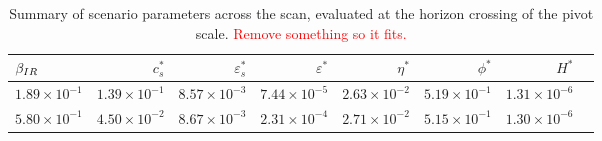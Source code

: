 
\begin{table}[h!]
  \begin{center}
    \begin{tabular}{lrrrrrrr}
        \toprule
        $\beta_{IR}$ &    $c_s^{*}$ &  $\varepsilon_s^{*}$ &   $\varepsilon^{*}$ &   $\eta^{*}$ &  $\phi^{*}$ &     $H^{*}$ \\
        \midrule
        $1.89\times 10^{-1}$  &  $1.39\times 10^{-1}$  &  $  8.57\times 10^{-3}$  &  $7.44\times 10^{-5}$  &  $2.63\times 10^{-2}$ &  $5.19\times 10^{-1}$  &  $1.31\times 10^{-6}$\\
        $5.80\times 10^{-1}$  &  $4.50\times 10^{-2}$  &  $  8.67\times 10^{-3}$  &  $2.31\times 10^{-4}$  &  $2.71\times 10^{-2}$ &  $5.15\times 10^{-1}$  &  $1.30\times 10^{-6}$\\
        \bottomrule
    \end{tabular}
    \caption{
        Summary of scenario parameters across the scan, evaluated at the horizon
      crossing of the pivot scale. \textcolor{red}{Remove something so it fits.}
      }\label{tab:scan_summary_sr}
  \end{center}
\end{table}




